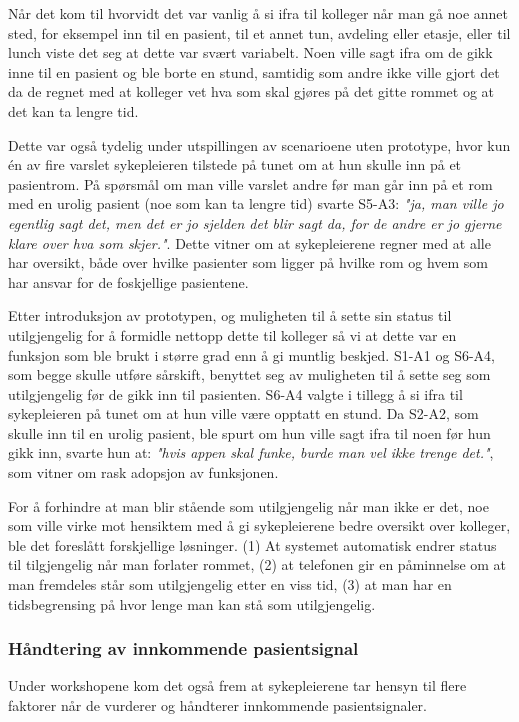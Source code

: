 \noindent
Når det kom til hvorvidt det var vanlig å si ifra til kolleger når man gå noe annet sted, for eksempel inn til en pasient, til et annet tun, avdeling eller etasje, eller til lunch viste det seg at dette var svært variabelt. Noen ville sagt ifra om de gikk inne til en pasient og ble borte en stund, samtidig som andre ikke ville gjort det da de regnet med at kolleger vet hva som skal gjøres på det gitte rommet og at det kan ta lengre tid.

\noindent
Dette var også tydelig under utspillingen av scenarioene uten prototype, hvor kun én av fire varslet sykepleieren tilstede på tunet om at hun skulle inn på et pasientrom. På spørsmål om man ville varslet andre før man går inn på et rom med en urolig pasient (noe som kan ta lengre tid) svarte S5-A3: \emph{"ja, man ville jo egentlig sagt det, men det er jo sjelden det blir sagt da, for de andre er jo gjerne klare over hva som skjer."}. Dette vitner om at sykepleierene regner med at alle har oversikt, både over hvilke pasienter som ligger på hvilke rom og hvem som har ansvar for de foskjellige pasientene.


\noindent
Etter introduksjon av prototypen, og muligheten til å sette sin status til  utilgjengelig for å formidle nettopp dette til kolleger så vi at dette var en funksjon som ble brukt i større grad enn å gi muntlig beskjed.
S1-A1 og S6-A4, som begge skulle utføre sårskift, benyttet seg av muligheten til å sette seg som utilgjengelig før de gikk inn til pasienten. S6-A4 valgte i tillegg å si ifra til sykepleieren på tunet om at hun ville være opptatt en stund. Da S2-A2, som skulle inn til en urolig pasient, ble spurt om hun ville sagt ifra til noen før hun gikk inn, svarte hun at: \emph{"hvis appen skal funke, burde man vel ikke trenge det."}, som vitner om rask adopsjon av funksjonen.

\noindent
For å forhindre at man blir stående som utilgjengelig når man ikke er det, noe som ville virke mot hensiktem med å gi sykepleierene bedre oversikt over kolleger, ble det foreslått forskjellige løsninger. (1) At systemet automatisk endrer status til tilgjengelig når man forlater rommet, (2) at telefonen gir en påminnelse om at man fremdeles står som utilgjengelig etter en viss tid, (3) at man har en tidsbegrensing på hvor lenge man kan stå som utilgjengelig.


\subsubsection{Håndtering av innkommende pasientsignal}
Under workshopene kom det også frem at sykepleierene tar hensyn til flere faktorer når de vurderer og håndterer innkommende pasientsignaler. 


